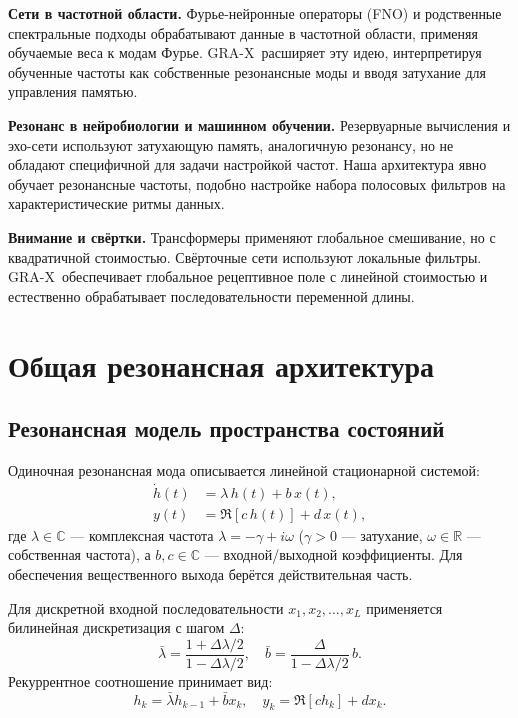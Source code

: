 \documentclass{article}
\newcommand{\R}{\mathbb{R}}
\newcommand{\C}{\mathbb{C}}
\newcommand{\GRA}{\textsc{GRA-X}}
\begin{document}
\textbf{Сети в частотной области.}
Фурье-нейронные операторы (FNO) и родственные спектральные подходы обрабатывают данные в частотной области, применяя обучаемые веса к модам Фурье.
\GRA\ расширяет эту идею, интерпретируя обученные частоты как собственные резонансные моды и вводя затухание для управления памятью.

\textbf{Резонанс в нейробиологии и машинном обучении.}
Резервуарные вычисления и эхо-сети используют затухающую память, аналогичную резонансу, но не обладают специфичной для задачи настройкой частот.
Наша архитектура явно обучает резонансные частоты, подобно настройке набора полосовых фильтров на характеристические ритмы данных.

\textbf{Внимание и свёртки.}
Трансформеры применяют глобальное смешивание, но с квадратичной стоимостью. Свёрточные сети используют локальные фильтры. \GRA\ обеспечивает глобальное рецептивное поле с линейной стоимостью и естественно обрабатывает последовательности переменной длины.

\section{Общая резонансная архитектура}
\label{sec:method}

\subsection{Резонансная модель пространства состояний}
Одиночная резонансная мода описывается линейной стационарной системой:
\begin{align}
  \dot{h}(t) &= \lambda\, h(t) + b\, x(t), \label{eq:ode} \\
  y(t) &= \Re\left[ c\, h(t) \right] + d\, x(t),
\end{align}
где \(\lambda \in \C\) — комплексная частота \(\lambda = -\gamma + i \omega\) (\(\gamma > 0\) — затухание, \(\omega \in \R\) — собственная частота), а \(b, c \in \C\) — входной/выходной коэффициенты. Для обеспечения вещественного выхода берётся действительная часть.

Для дискретной входной последовательности \(x_1, x_2, \dots, x_L\) применяется билинейная дискретизация с шагом \(\Delta\):
\begin{equation}
  \bar{\lambda} = \frac{1+\Delta\lambda/2}{1-\Delta\lambda/2}, \quad
  \bar{b} = \frac{\Delta}{1-\Delta\lambda/2}\, b.
\end{equation}
Рекуррентное соотношение принимает вид:
\begin{equation}
  h_k = \bar{\lambda} h_{k-1} + \bar{b} x_k, \quad y_k = \Re\left[c h_k\right] + d x_k.
\end{equation}
\end{document}
